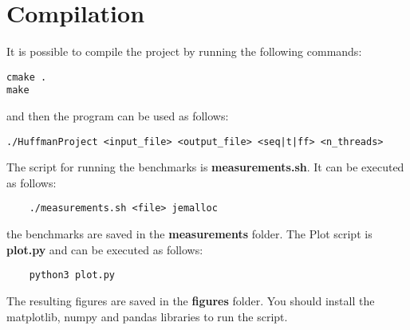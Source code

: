 \documentclass{article}
\begin{document}
\section{Compilation}
It is possible to compile the project by running the following commands:
\begin{verbatim}
cmake .
make
\end{verbatim}
and then the program can be used as follows:
\begin{verbatim}
./HuffmanProject <input_file> <output_file> <seq|t|ff> <n_threads>
\end{verbatim}
The script for running the benchmarks is \textbf{measurements.sh}.
It can be executed as follows:
\begin{verbatim}
    ./measurements.sh <file> jemalloc
\end{verbatim}
the benchmarks are saved in the \textbf{measurements} folder.
The Plot script is \textbf{plot.py} and can be executed as follows:
\begin{verbatim}
    python3 plot.py
\end{verbatim}
The resulting figures are saved in the \textbf{figures} folder.
You should install the matplotlib, numpy and pandas libraries to run the script.
\end{document}
